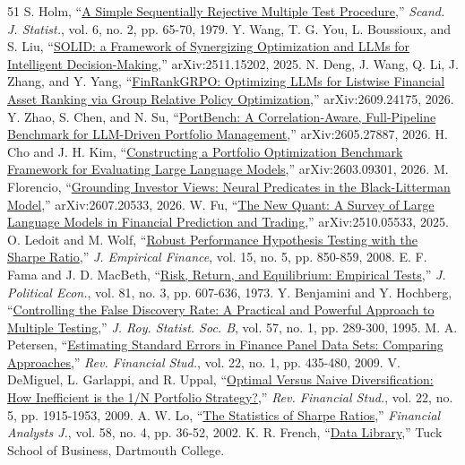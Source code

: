\documentclass[conference]{IEEEtran}
\begin{document}
{\begin{thebibliography}{51}
 S. Holm, ``\href{https://www.jstor.org/stable/4615733}{A Simple Sequentially Rejective Multiple Test Procedure},'' \textit{Scand. J. Statist.}, vol. 6, no. 2, pp. 65-70, 1979.
 Y. Wang, T. G. You, L. Boussioux, and S. Liu, ``\href{https://arxiv.org/abs/2511.15202}{SOLID: a Framework of Synergizing Optimization and LLMs for Intelligent Decision-Making},'' arXiv:2511.15202, 2025.
 N. Deng, J. Wang, Q. Li, J. Zhang, and Y. Yang, ``\href{https://arxiv.org/abs/2609.24175}{FinRankGRPO: Optimizing LLMs for Listwise Financial Asset Ranking via Group Relative Policy Optimization},'' arXiv:2609.24175, 2026.
 Y. Zhao, S. Chen, and N. Su, ``\href{https://arxiv.org/abs/2605.27887}{PortBench: A Correlation-Aware, Full-Pipeline Benchmark for LLM-Driven Portfolio Management},'' arXiv:2605.27887, 2026.
 H. Cho and J. H. Kim, ``\href{https://arxiv.org/abs/2603.09301}{Constructing a Portfolio Optimization Benchmark Framework for Evaluating Large Language Models},'' arXiv:2603.09301, 2026.
 M. Florencio, ``\href{https://arxiv.org/abs/2607.20533}{Grounding Investor Views: Neural Predicates in the Black-Litterman Model},'' arXiv:2607.20533, 2026.
 W. Fu, ``\href{https://arxiv.org/abs/2510.05533}{The New Quant: A Survey of Large Language Models in Financial Prediction and Trading},'' arXiv:2510.05533, 2025.
 O. Ledoit and M. Wolf, ``\href{https://www.econ.uzh.ch/apps/workingpapers/wp/iewwp320.pdf}{Robust Performance Hypothesis Testing with the Sharpe Ratio},'' \textit{J. Empirical Finance}, vol. 15, no. 5, pp. 850-859, 2008.
 E. F. Fama and J. D. MacBeth, ``\href{https://doi.org/10.1086/260061}{Risk, Return, and Equilibrium: Empirical Tests},'' \textit{J. Political Econ.}, vol. 81, no. 3, pp. 607-636, 1973.
 Y. Benjamini and Y. Hochberg, ``\href{https://rss.onlinelibrary.wiley.com/doi/10.1111/j.2517-6161.1995.tb02031.x}{Controlling the False Discovery Rate: A Practical and Powerful Approach to Multiple Testing},'' \textit{J. Roy. Statist. Soc. B}, vol. 57, no. 1, pp. 289-300, 1995.
 M. A. Petersen, ``\href{https://papers.ssrn.com/sol3/papers.cfm?abstract_id=1320561}{Estimating Standard Errors in Finance Panel Data Sets: Comparing Approaches},'' \textit{Rev. Financial Stud.}, vol. 22, no. 1, pp. 435-480, 2009.
 V. DeMiguel, L. Garlappi, and R. Uppal, ``\href{https://econpapers.repec.org/RePEc:oup:rfinst:v:22:y:2009:i:5:p:1915-1953}{Optimal Versus Naive Diversification: How Inefficient is the 1/N Portfolio Strategy?},'' \textit{Rev. Financial Stud.}, vol. 22, no. 5, pp. 1915-1953, 2009.
 A. W. Lo, ``\href{https://www.tandfonline.com/doi/abs/10.2469/faj.v58.n4.2453}{The Statistics of Sharpe Ratios},'' \textit{Financial Analysts J.}, vol. 58, no. 4, pp. 36-52, 2002.
 K. R. French, ``\href{https://mba.tuck.dartmouth.edu/pages/faculty/ken.french/data_library.html}{Data Library},'' Tuck School of Business, Dartmouth College.
\end{thebibliography}}
\end{document}
